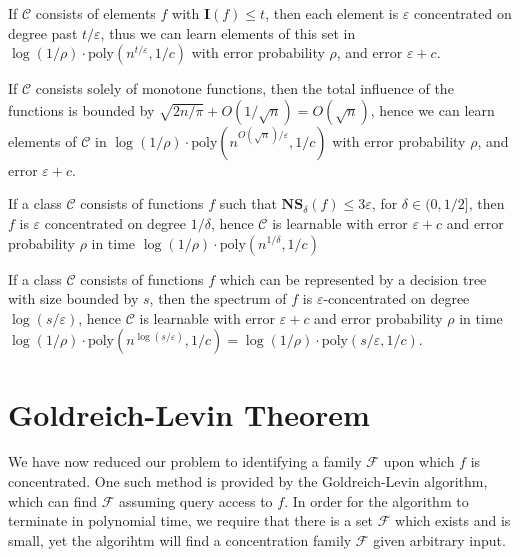 \begin{example}
    If $\mathcal{C}$ consists of elements $f$ with $\mathbf{I}(f) \leq t$, then each element is $\varepsilon$ concentrated on degree past $t/\varepsilon$, thus we can learn elements of this set in $\log(1/\rho) \cdot \text{poly}(n^{t/\varepsilon}, 1/c)$ with error probability $\rho$, and error $\varepsilon + c$.
\end{example}

\begin{example}
    If $\mathcal{C}$ consists solely of monotone functions, then the total influence of the functions is bounded by $\sqrt{2n/\pi} + O(1/\sqrt{n}) = O(\sqrt{n})$, hence we can learn elements of $\mathcal{C}$ in $\log(1/\rho) \cdot \text{poly}(n^{O(\sqrt{n})/\varepsilon},1/c)$ with error probability $\rho$, and error $\varepsilon + c$.
\end{example}

\begin{example}
    If a class $\mathcal{C}$ consists of functions $f$ such that $\mathbf{NS}_\delta(f) \leq 3\varepsilon$, for $\delta \in (0,1/2]$, then $f$ is $\varepsilon$ concentrated on degree $1/\delta$, hence $\mathcal{C}$ is learnable with error $\varepsilon + c$ and error probability $\rho$ in time $\log(1/\rho) \cdot \text{poly}(n^{1/\delta},1/c)$
\end{example}

\begin{example}
    If a class $\mathcal{C}$ consists of functions $f$ which can be represented by a decision tree with size bounded by $s$, then the spectrum of $f$ is $\varepsilon$-concentrated on degree $\log(s/\varepsilon)$, hence $\mathcal{C}$ is learnable with error $\varepsilon + c$ and error probability $\rho$ in time $\log(1/\rho) \cdot \text{poly}(n^{\log(s/\varepsilon)}, 1/c) = \log(1/\rho) \cdot \text{poly}(s/\varepsilon, 1/c)$.
\end{example}




\section{Goldreich-Levin Theorem}

We have now reduced our problem to identifying a family $\mathcal{F}$ upon which $f$ is concentrated. One such method is provided by the Goldreich-Levin algorithm, which can find $\mathcal{F}$ assuming query access to $f$. In order for the algorithm to terminate in polynomial time, we require that there is a set $\mathcal{F}$ which exists and is small, yet the algorihtm will find a concentration family $\mathcal{F}$ given arbitrary input.

